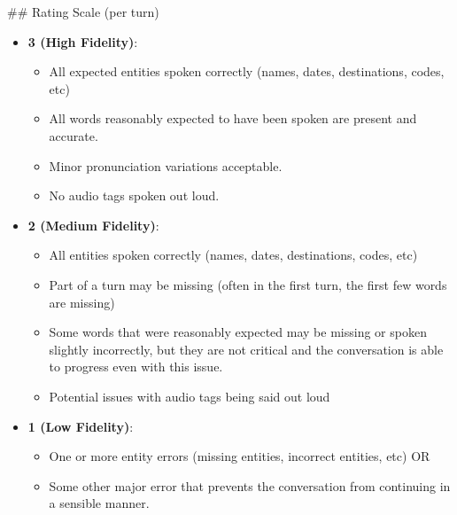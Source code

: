 \begin{tcolorbox}[promptbox, title={\small User Speech Fidelity Prompt}]
        \#\# Rating Scale (per turn)
        \begin{itemize}
          \item \textbf{3 (High Fidelity)}:
          \begin{itemize}
            \item All expected entities spoken correctly (names, dates, destinations, codes, etc)
            \item All words reasonably expected to have been spoken are present and accurate.
            \item Minor pronunciation variations acceptable.
            \item No audio tags spoken out loud.
          \end{itemize}
          \item \textbf{2 (Medium Fidelity)}:
          \begin{itemize}
            \item All entities spoken correctly (names, dates, destinations, codes, etc)
            \item Part of a turn may be missing (often in the first turn, the first few words are missing)
            \item Some words that were reasonably expected may be missing or spoken slightly incorrectly, but they are not critical and the conversation is able to progress even with this issue.
            \item Potential issues with audio tags being said out loud
          \end{itemize}
          \item \textbf{1 (Low Fidelity)}:
          \begin{itemize}
            \item One or more entity errors (missing entities, incorrect entities, etc) OR
            \item Some other major error that prevents the conversation from continuing in a sensible manner.
          \end{itemize}
        \end{itemize}


\end{tcolorbox}
